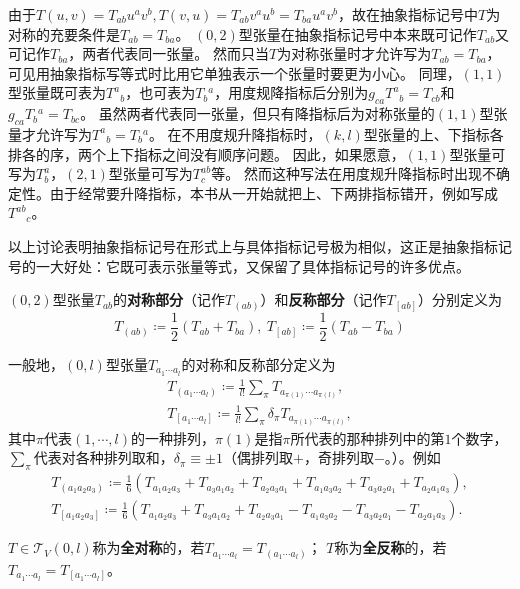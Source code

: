由于$T(u, v) = T_{ab}u^av^b, T(v, u) = T_{ab}v^au^b = T_{ba}u^av^b$，故在抽象指标记号中$T$为对称的充要条件是$T_{ab} = T_{ba}$。
$(0, 2)$型张量在抽象指标记号中本来既可记作$T_{ab}$又可记作$T_{ba}$，两者代表同一张量。
然而只当$T$为对称张量时才允许写为$T_{ab} = T_{ba}$，可见用抽象指标写等式时比用它单独表示一个张量时要更为小心。
同理，$(1, 1)$型张量既可表为$T^a{}_b$，也可表为$T_b{}^a$，用度规降指标后分别为$g_{ca}T^a{}_b = T_{cb}$和$g_{ca}T_b{}^a = T_{bc}$。
虽然两者代表同一张量，但只有降指标后为对称张量的$(1, 1)$型张量才允许写为$T^a{}_b = T_b{}^a$。
在不用度规升降指标时，$(k, l)$型张量的上、下指标各排各的序，两个上下指标之间没有顺序问题。
因此，如果愿意，$(1, 1)$型张量可写为$T^a_b$，$(2, 1)$型张量可写为$T^{ab}_c$等。
然而这种写法在用度规升降指标时出现不确定性。由于经常要升降指标，本书从一开始就把上、下两排指标错开，例如写成$T^{ab}{}_c$。

以上讨论表明抽象指标记号在形式上与具体指标记号极为相似，这正是抽象指标记号的一大好处：它既可表示张量等式，又保留了具体指标记号的许多优点。

\begin{definition}
$(0, 2)$型张量$T_{ab}$的\textbf{对称部分}（记作$T_{(ab)}$）和\textbf{反称部分}（记作$T_{[ab]}$）分别定义为
$$T_{(ab)} \coloneq \frac{1}{2}(T_{ab} + T_{ba}), ~ T_{[ab]} \coloneq \frac{1}{2}(T_{ab} - T_{ba})$$
\end{definition}

一般地，$(0, l)$型张量$T_{a_1 \cdots a_l}$的对称和反称部分定义为
\begin{gather*}
T_{(a_1 \cdots a_l)} \coloneq \frac{1}{l!}\sum_\pi T_{a_{\pi(1)} \cdots a_{\pi(l)}}, \\
T_{[a_1 \cdots a_l]} \coloneq \frac{1}{l!}\sum_\pi \delta_\pi T_{a_{\pi(1)} \cdots a_{\pi(l)}},
\end{gather*}
其中$\pi$代表$(1, \cdots, l)$的一种排列，$\pi(1)$是指$\pi$所代表的那种排列中的第$1$个数字，$\sum\limits_\pi$代表对各种排列取和，$\delta_\pi \equiv \pm 1$（偶排列取$+$，奇排列取$-$。）。例如
\begin{gather*}
T_{(a_1 a_2 a_3)} \coloneq \frac{1}{6}(T_{a_1a_2a_3} + T_{a_3a_1a_2} + T_{a_2a_3a_1} + T_{a_1a_3a_2} + T_{a_3a_2a_1} + T_{a_2a_1a_3}), \\
T_{[a_1 a_2 a_3]} \coloneq \frac{1}{6}(T_{a_1a_2a_3} + T_{a_3a_1a_2} + T_{a_2a_3a_1} - T_{a_1a_3a_2} - T_{a_3a_2a_1} - T_{a_2a_1a_3}).
\end{gather*}

\begin{definition}
$T \in \mathscr{T}_V(0, l)$称为\textbf{全对称}的，若$T_{a_1 \cdots a_l} = T_{(a_1 \cdots a_l)}$；
$T$称为\textbf{全反称}的，若$T_{a_1 \cdots a_l} = T_{[a_1 \cdots a_l]}$。
\end{definition}

